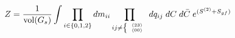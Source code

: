 \begin{equation}
Z = \frac{1}{\mathrm{vol}(G_s)} \int \prod_{i\in\{0,1,2\}}dm_{ii} \prod_{ij \ne
{\tiny \left\{\begin{array}{c}(23)\\(00)\end{array}\right.}} dq_{ij}
\;d C \;d\bar C \;e^{(S^{(2)}+S_{gf})}
\end{equation}

